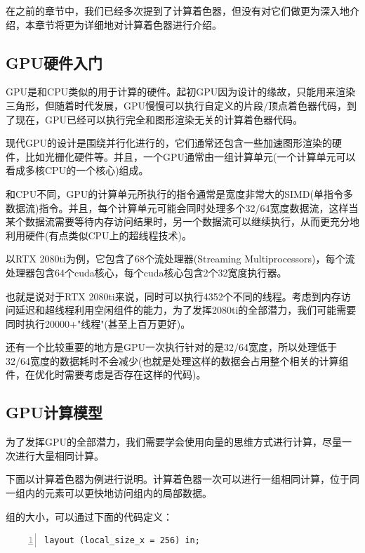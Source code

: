 \documentclass{ctexart}
\begin{document}
在之前的章节中，我们已经多次提到了计算着色器，但没有对它们做更为深入地介绍，本章节将更为详细地对计算着色器进行介绍。

\subsection{GPU硬件入门}

GPU是和CPU类似的用于计算的硬件。起初GPU因为设计的缘故，只能用来渲染三角形，但随着时代发展，GPU慢慢可以执行自定义的片段/顶点着色器代码，到了现在，GPU已经可以执行完全和图形渲染无关的计算着色器代码。

现代GPU的设计是围绕并行化进行的，它们通常还包含一些加速图形渲染的硬件，比如光栅化硬件等。并且，一个GPU通常由一组计算单元(一个计算单元可以看成多核CPU的一个核心)组成。

和CPU不同，GPU的计算单元所执行的指令通常是宽度非常大的SIMD(单指令多数据流)指令。并且，每个计算单元可能会同时处理多个32/64宽度数据流，这样当某个数据流需要等待内存访问结果时，另一个数据流可以继续执行，从而更充分地利用硬件(有点类似CPU上的超线程技术)。

以RTX 2080ti为例，它包含了68个流处理器(Streaming Multiprocessors)，每个流处理器包含64个cuda核心，每个cuda核心包含2个32宽度执行器。

也就是说对于RTX 2080ti来说，同时可以执行4352个不同的线程。考虑到内存访问延迟和超线程利用空闲组件的能力，为了发挥2080ti的全部潜力，我们可能需要同时执行20000+"线程"(甚至上百万更好)。

还有一个比较重要的地方是GPU一次执行针对的是32/64宽度，所以处理低于32/64宽度的数据耗时不会减少(也就是处理这样的数据会占用整个相关的计算组件，在优化时需要考虑是否存在这样的代码)。

\subsection{GPU计算模型}

为了发挥GPU的全部潜力，我们需要学会使用向量的思维方式进行计算，尽量一次进行大量相同计算。

下面以计算着色器为例进行说明。计算着色器一次可以进行一组相同计算，位于同一组内的元素可以更快地访问组内的局部数据。

组的大小，可以通过下面的代码定义：


\begin{lstlisting}[language={[ANSI]C},keywordstyle=\color{blue!70},commentstyle=\color{red!50!green!50!blue!50},frame=shadowbox, rulesepcolor=\color{red!20!green!20!blue!20},basicstyle=\small,numbers=left, numberstyle=\tiny,breaklines=true]
layout (local_size_x = 256) in;
\end{lstlisting}
\end{document}
